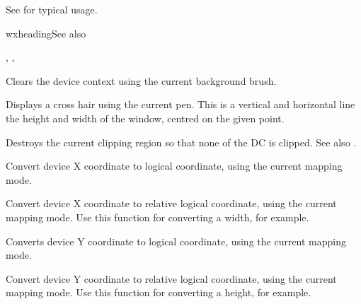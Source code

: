 See  for typical usage.

wxheading{See also}

, , 

\label{wxdcclear}


Clears the device context using the current background brush.

\label{wxdccrosshair}


Displays a cross hair using the current pen. This is a vertical
and horizontal line the height and width of the window, centred
on the given point.

\label{wxdcdestroyclippingregion}


Destroys the current clipping region so that none of the DC is clipped.
See also .

\label{wxdcdevicetologicalx}


Convert device X coordinate to logical coordinate, using the current
mapping mode.

\label{wxdcdevicetologicalxrel}


Convert device X coordinate to relative logical coordinate, using the current
mapping mode. Use this function for converting a width, for example.

\label{wxdcdevicetologicaly}


Converts device Y coordinate to logical coordinate, using the current
mapping mode.

\label{wxdcdevicetologicalyrel}


Convert device Y coordinate to relative logical coordinate, using the current
mapping mode. Use this function for converting a height, for example.

